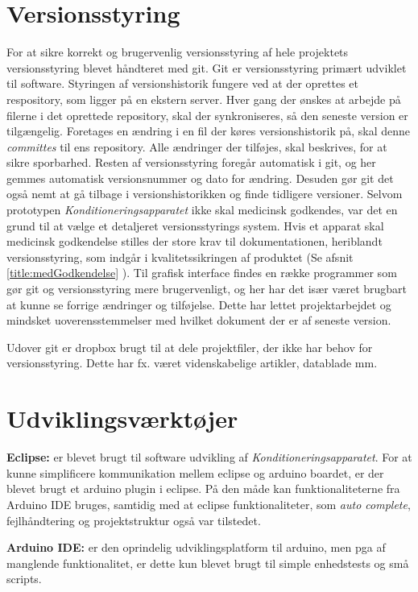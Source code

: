 \section{Versionsstyring} \label{title:versionsstyring}
For at sikre korrekt og brugervenlig versionsstyring af hele projektets versionsstyring blevet håndteret med git. Git er versionsstyring primært udviklet til software. Styringen af versionshistorik fungere ved at der oprettes et respository, som ligger på en ekstern server. Hver gang der ønskes at arbejde på filerne i det oprettede repository, skal der synkroniseres, så den seneste version er tilgængelig. Foretages en ændring i en fil der køres versionshistorik på, skal denne \textit{committes} til ens repository. Alle ændringer der tilføjes, skal beskrives, for at sikre sporbarhed. Resten af versionsstyring foregår automatisk i git, og her gemmes automatisk versionsnummer og dato for ændring. Desuden gør git det også nemt at gå tilbage i versionshistorikken og finde tidligere versioner. 
Selvom prototypen \textit{Konditioneringsapparatet} ikke skal medicinsk godkendes, var det en grund til at vælge et detaljeret versionsstyrings system. Hvis et apparat skal medicinsk godkendelse stilles der store krav til dokumentationen, heriblandt versionsstyring, som indgår i kvalitetssikringen af produktet (Se afsnit \ref{title:medGodkendelse} ). 
Til grafisk interface findes en række programmer som gør git og versionsstyring mere brugervenligt, og her har det især været brugbart at kunne se forrige ændringer og tilføjelse. Dette har lettet projektarbejdet og mindsket uoverensstemmelser med hvilket dokument der er af seneste version. 

Udover git er dropbox brugt til at dele projektfiler, der ikke har behov for versionsstyring. Dette har fx. været videnskabelige artikler, datablade mm. 

\section{Udviklingsværktøjer}\label{title:udviklingsvaerktoejer}
\textbf{Eclipse:} er blevet brugt til software udvikling af \textit{Konditioneringsapparatet}. For at kunne simplificere kommunikation mellem eclipse og arduino boardet, er der blevet brugt et arduino plugin i eclipse. På den måde kan funktionaliteterne fra Arduino IDE bruges, samtidig med at eclipse funktionaliteter, som \textit{auto complete}, fejlhåndtering og projektstruktur også var tilstedet. 

\textbf{Arduino IDE:} er den oprindelig udviklingsplatform til arduino, men pga af manglende funktionalitet, er dette kun blevet brugt til simple enhedstests og små scripts. 

